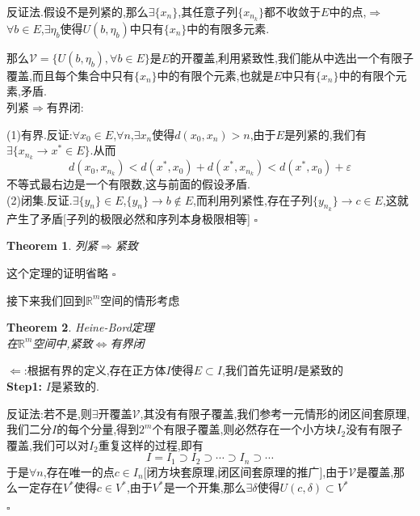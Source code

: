 \documentclass[11pt,hyperref,a4paper,UTF8]{ctexart}
\newtheorem{theorem}{Theorem}[subsection]
\newenvironment{cproof}{%
\heiti{证明}\kaishu
}{%
  \hfill $\square$
  \par\bigskip
}
\newcommand{\RR}{\mathbb{R}}
\begin{document}
\begin{CJK}{UTF8}{gkai}
\begin{cproof}
  反证法.假设不是列紧的,那么$\exists \{x_n\}$,其任意子列$\{x_{n_k}\}$都不收敛于$E$中的点,$\Rightarrow$ $\forall b \in E$,$\exists \eta_b$使得$U(b,\eta_b)$中只有$\{x_n\}$中的有限多元素.

  那么$\mathcal{V} = \{U(b,\eta_b),\forall b \in E\}$是$E$的开覆盖,利用紧致性,我们能从中选出一个有限子覆盖,而且每个集合中只有$\{x_n\}$中的有限个元素,也就是$E$中只有$\{x_n\}$中的有限个元素,矛盾.\\

  列紧$\Rightarrow$有界闭:

  (1)有界.反证:$\forall x_0 \in E$,$\forall n$,$\exists x_n$使得$d(x_0,x_n) > n$,由于$E$是列紧的,我们有$\exists \{x_{n_k} \to x^\ast \in E\}$.从而
  \[d(x_0,x_{n_k}) < d(x^\ast,x_0) + d(x^\ast,x_{n_k}) < d(x^\ast,x_0) + \varepsilon\]
  不等式最右边是一个有限数,这与前面的假设矛盾.\\

  (2)闭集.反证.$\exists \{y_n\} \in E$,$\{y_n\} \to b\notin E$,而利用列紧性,存在子列$\{y_{n_k}\} \to c \in E$,这就产生了矛盾[子列的极限必然和序列本身极限相等]
\end{cproof}

\begin{theorem}
  列紧$\Rightarrow$紧致
\end{theorem}

\begin{cproof}
  这个定理的证明省略
\end{cproof}

接下来我们回到$\RR^m$空间的情形考虑
\begin{theorem}
  Heine-Bord定理\\

  在$\RR^m$空间中,紧致$\Leftrightarrow$有界闭
\end{theorem}

\begin{cproof}
  $\Leftarrow$:根据有界的定义,存在正方体$I$使得$E \subset I$,我们首先证明$I$是紧致的\\

  \textbf{Step1:} $I$是紧致的.

  反证法:若不是,则$\exists$开覆盖$\mathcal{V}$,其没有有限子覆盖,我们参考一元情形的闭区间套原理,我们二分$I$的每个分量,得到$2^m$个有限子覆盖,则必然存在一个小方块$I_2$没有有限子覆盖,我们可以对$I_2$重复这样的过程,即有
  \[I = I_1 \supset I_2 \supset \cdots \supset I_n \supset \cdots\]
  于是$\forall n$,存在唯一的点$c \in I_n$[闭方块套原理,闭区间套原理的推广],由于$\mathcal{V}$是覆盖,那么一定存在$V^\ast$使得$c \in V^\ast$,由于$V^\ast$是一个开集,那么$\exists \delta$使得$U(c,\delta) \subset V^\ast$


\end{cproof}
\end{CJK}
\end{document}
